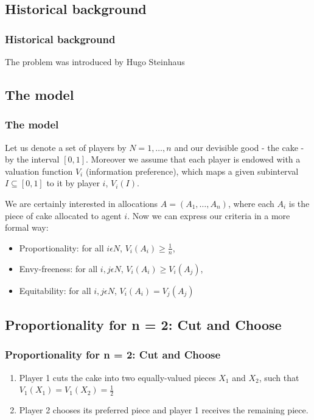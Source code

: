 \documentclass{beamer}
\begin{document}
\subsection{Historical background}
\begin{frame}
\frametitle{Historical background}
The problem was introduced by Hugo Steinhaus   
\end{frame}


\subsection{The model}
\begin{frame}
\frametitle{The model}
    Let us denote a set of players by $N={1,\dots,n}$ and our devisible good - the cake - by the interval $[0,1]$. Moreover we assume that each player is endowed with a valuation function $V_{i}$ (information preference), which maps a given subinterval $I\subseteq[0,1]$ to it by player $i$, $V_{i}(I)$. 

    We are certainly interested in allocations $A=(A_1,\dots,A_n)$, where each $A_i$ is the piece of cake allocated to agent $i$. Now we can express our criteria in a more formal way:
\begin{itemize}
    \item Proportionality: for all $i\epsilon{N}$, $V_{i}(A_i)\geq\frac{1}{n}$,
    \item Envy-freeness: for all $i,j\epsilon{N}$, $V_{i}(A_i)\geq{V_i}(A_j)$,
    \item Equitability: for all $i,j\epsilon{N}$, $V_{i}(A_i)={V_j}(A_j)$
\end{itemize}
\end{frame}


\subsection{Proportionality for n = 2: Cut and Choose}
\begin{frame}
\frametitle{Proportionality for n = 2: Cut and Choose}
\begin{enumerate}
    \item Player 1 cuts the cake into two equally-valued pieces $X_1$ and $X_2$, such that $V_1(X_1)=V_1(X_2)=\frac{1}{2}$
    \item Player 2 chooses its preferred piece and player 1 receives the remaining piece.
\end{enumerate}
\end{frame}
\end{document}
